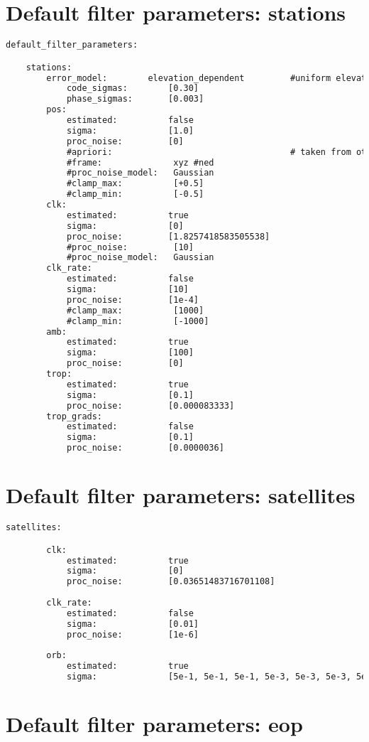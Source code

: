 \section{Default filter parameters: stations}

\begin{lstlisting}[language=xml,caption=yaml input files configuration example]
default_filter_parameters:

	stations:	
		error_model:        elevation_dependent         #uniform elevation_dependent
			code_sigmas:        [0.30]
			phase_sigmas:       [0.003]
		pos:
			estimated:          false
			sigma:              [1.0]
			proc_noise:         [0]
			#apriori:                                   # taken from other source, rinex file etc.
			#frame:              xyz #ned
			#proc_noise_model:   Gaussian
			#clamp_max:          [+0.5]
			#clamp_min:          [-0.5]
		clk:
			estimated:          true
			sigma:              [0]
			proc_noise:         [1.8257418583505538]
			#proc_noise:         [10]
			#proc_noise_model:   Gaussian
		clk_rate:
			estimated:          false
			sigma:              [10]
			proc_noise:         [1e-4]
			#clamp_max:          [1000]
			#clamp_min:          [-1000]
		amb:
			estimated:          true
			sigma:              [100]
			proc_noise:         [0]
		trop:
			estimated:          true
			sigma:              [0.1]
			proc_noise:         [0.000083333]
		trop_grads:
			estimated:          false
			sigma:              [0.1]
			proc_noise:         [0.0000036]
\end{lstlisting}

\section{Default filter parameters: satellites}

\begin{lstlisting}[language=xml,caption=yaml input files configuration example]
    satellites:

		clk:
			estimated:          true
			sigma:              [0]
			proc_noise:         [0.03651483716701108]
		
		clk_rate:
			estimated:          false
			sigma:              [0.01]
			proc_noise:         [1e-6]
		
		orb:
			estimated:          true
			sigma:              [5e-1, 5e-1, 5e-1, 5e-3, 5e-3, 5e-3, 5e-1]
\end{lstlisting}

\section{Default filter parameters: eop}

